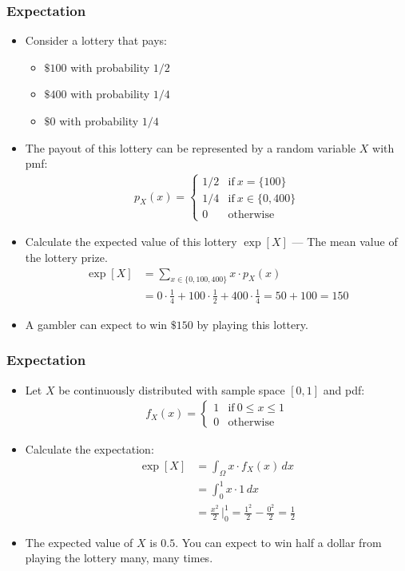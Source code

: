 \begin{frame}
\frametitle{Expectation} 
\begin{itemize}
\item Consider a lottery that pays:
\begin{itemize} 
\item $\$ 100$ with probability $1/2$
\item $\$400$ with probability $1/4$
\item $\$0$ with probability $1/4$
\end{itemize}
\item The payout of this lottery can be represented by a random variable $X$ with pmf:
\begin{align*}
p_X(x) = 
  \begin{cases}
  1/2 & \text{if}~ x = \{100\} \\
  1/4 & \text{if}~ x \in \{0,400\} \\
    0 & \text{otherwise} 
  \end{cases}	
\end{align*} 
\item Calculate the expected value of this lottery $\exp[X]$ --- The mean value of the lottery prize.
\begin{align*}
\exp[X] 
    & = \sum_{x\in \{0,100,400\}} x \cdot p_X(x)\\
    & = 0 \cdot \frac{1}{4} + 100 \cdot \frac{1}{2} + 400 \cdot \frac{1}{4}
      = 50 + 100 
      = 150
\end{align*}
\item A gambler can expect to win $\$150$ by playing this lottery.
\end{itemize}
\end{frame}


\begin{frame}
\frametitle{Expectation} 
\begin{itemize}
\item Let $X$ be continuously distributed with sample space $[0,1]$ and pdf:
\begin{align*}
f_X(x) = 
  \begin{cases}
    1 & \text{if}~ 0 \leq x \leq 1\\[1ex]
    0 & \text{otherwise}
  \end{cases}
\end{align*} 
\item Calculate the expectation:
\begin{align*}
\exp[X] 
    & = \int_{\Omega} x \cdot f_X(x)\,dx\\
    & = \int_{0}^{1} x \cdot 1\,dx\\
    & = \frac{x^2}{2}\,\bigg|_0^1
      = \frac{1^{2}}{2} - \frac{0^{2}}{2}
      = \frac{1}{2}
\end{align*}
\item The expected value of $X$ is $0.5$. You can expect to win half a dollar from playing the lottery many, many times. 
\end{itemize}
\end{frame}



